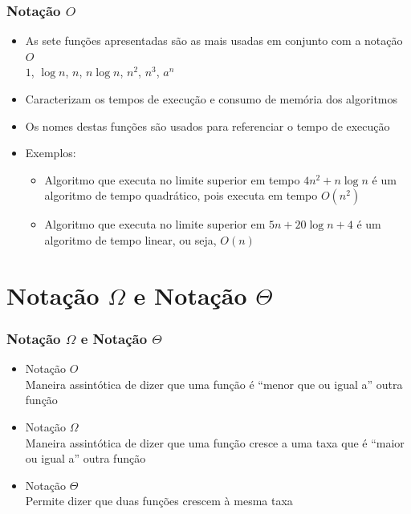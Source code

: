 \documentclass[aspectratio=169]{beamer}
\begin{document}
\begin{frame}\frametitle{Notação $O$}
\begin{itemize}
	\item As sete funções apresentadas são as mais usadas em conjunto com a notação $O$\\
$1$, $\log{n}$, $n$, $n\log{n}$, $n^2$, $n^3$, $a^n$
	\item Caracterizam os tempos de execução e consumo de memória dos algoritmos
	\item Os nomes destas funções são usados para referenciar o tempo de execução
	\item Exemplos:
	\begin{itemize}
		\item  Algoritmo que executa no limite superior em tempo $4n^2 + n\log{n}$ é um algoritmo de tempo quadrático, pois executa em tempo $O(n^2)$
		\item Algoritmo que executa no limite superior em $5n + 20\log{n} + 4$ é um algoritmo de tempo linear, ou seja, $O(n)$
	\end{itemize}
	\end{itemize}
\end{frame}

\section{Notação $\Omega$ e Notação $\Theta$}

\begin{frame}\frametitle{Notação $\Omega$ e Notação $\Theta$}
\begin{itemize}
	\item Notação $O$\\
	Maneira assintótica de dizer que uma função é ``menor que ou igual a'' outra função
	\item Notação $\Omega$\\
	Maneira assintótica de dizer que uma função cresce a uma taxa que é ``maior ou igual a'' outra função
	\item Notação $\Theta$\\
	Permite dizer que duas funções crescem à mesma taxa
	\end{itemize}
\end{frame}
\end{document}
